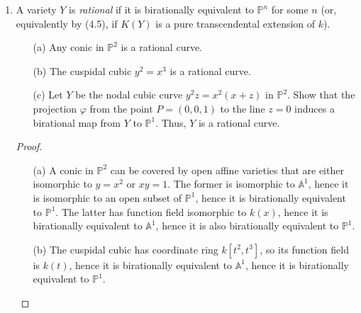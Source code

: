 \documentclass[12pt]{article}
\newcommand{\A}{\mathbb{A}}
\newcommand{\PP}{\mathbb{P}}
\theoremstyle{definition}
\begin{document}
\begin{enumerate} [label=\textbf{\arabic*.}, leftmargin=-0.05em]
\begin{proof}
    If $\varphi : X \to Y$ is a rational map, then the set of open subsets of $X$ on which $\varphi$ is represented by morphism function is nonempty, and since $X$ is a noetherian space, there is a maximal element in this set. Then, the largest open subset $U$ of $X$ on which $\varphi$ is represented by a morphism is the union of maximal elements in this subset of open subsets.
\end{proof}

\item A variety $Y$ is \textit{rational} if it is birationally equivalent to $\PP^n$ for some $n$ (or, equivalently by (4.5), if $K(Y)$ is a pure transcendental extension of $k$).
\begin{itemize}
    \item[(a)] Any conic in $\PP^2$ is a rational curve.
    \item[(b)] The cuspidal cubic $y^2 = x^3$ is a rational curve.
    \item[(c)] Let $Y$ be the nodal cubic curve $y^2 z = x^2(x + z)$ in $\PP^2$. Show that the projection $\varphi$ from the point $P = (0, 0, 1)$ to the line $z = 0$ induces a birational map from $Y$ to $\PP^1$. Thus, $Y$ is a rational curve.
\end{itemize}

\begin{proof} $ $ \vspace{0pt}
    \begin{itemize}
        \item[(a)] A conic in $\PP^2$ can be covered by open affine varieties that are either isomorphic to $y = x^2$ or $xy = 1$. The former is isomorphic to $\A^1$, hence it is isomorphic to an open subset of $\PP^1$, hence it is birationally equivalent to $\PP^1$. The latter has function field isomorphic to $k(x)$, hence it is birationally equivalent to $\A^1$, hence it is also birationally equivalent to $\PP^1$.
        \filbreak

        \item[(b)] The cuspidal cubic has coordinate ring $k[t^2, t^3]$, so its function field is $k(t)$, hence it is birationally equivalent to $\A^1$, hence it is birationally equivalent to $\PP^1$.


\end{itemize}
\end{proof}
\end{enumerate}
\end{document}
